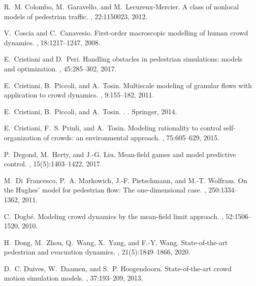\documentclass{cmslatex}
\begin{document}
\begin{thebibliography}{}
R.~M. Colombo, M.~Garavello, and M.~Lecureux-Mercier.
\newblock A class of nonlocal models of pedestrian traffic.
, 22:1150023, 2012.

V.~Coscia and C.~Canavesio.
\newblock First-order macroscopic modelling of human crowd dynamics.
, 18:1217--1247, 2008.

E.~Cristiani and D.~Peri.
\newblock Handling obstacles in pedestrian simulations: models and
  optimization.
, 45:285--302, 2017.

E.~Cristiani, B.~Piccoli, and A.~Tosin.
\newblock Multiscale modeling of granular flows with application to crowd
  dynamics.
, 9:155--182, 2011.

E.~Cristiani, B.~Piccoli, and A.~Tosin.
.
. Springer, 2014.

E.~Cristiani, F.~S. Priuli, and A.~Tosin.
\newblock Modeling rationality to control self-organization of crowds: an
  environmental approach.
, 75:605--629, 2015.

P.~Degond, M.~Herty, and J.-G. Liu.
\newblock Mean-field games and model predictive control.
, 15(5):1403--1422,
  2017.

M.~Di~Francesco, P.~A. Markowich, J.-F. Pietschmann, and M.-T. Wolfram.
\newblock On the {H}ughes' model for pedestrian flow: {T}he one-dimensional
  case.
, 250:1334--1362, 2011.

C.~Dogb\'e.
\newblock Modeling crowd dynamics by the mean-field limit approach.
, 52:1506--1520, 2010.

H.~Dong, M.~Zhou, Q.~Wang, X.~Yang, and F.-Y. Wang.
\newblock State-of-the-art pedestrian and evacuation dynamics.
,
  21(5):1849--1866, 2020.

D.~C. Duives, W.~Daamen, and S.~P. Hoogendoorn.
\newblock State-of-the-art crowd motion simulation models.
, 37:193--209, 2013.


\end{thebibliography}
\end{document}
